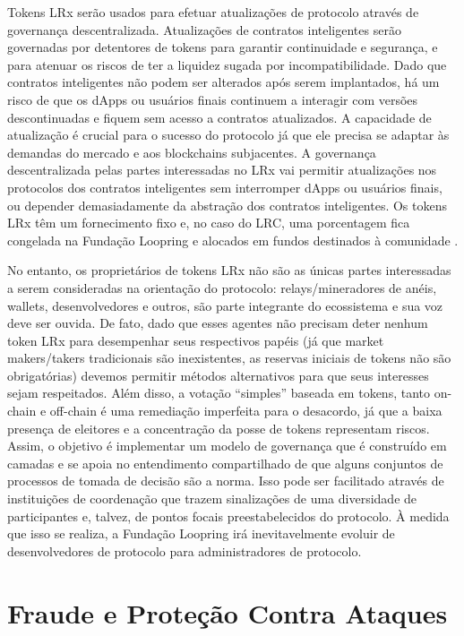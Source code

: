 \documentclass[UTF8,nofonts]{article}
\begin{document}
\begin{multicols}{2}
Tokens LRx serão usados para efetuar atualizações de protocolo através de governança descentralizada. Atualizações de contratos inteligentes serão governadas por detentores de tokens para garantir continuidade e segurança, e para atenuar os riscos de ter a liquidez sugada por incompatibilidade. Dado que contratos inteligentes não podem ser alterados após serem implantados, há um risco de que os dApps ou usuários finais continuem a interagir com versões descontinuadas e fiquem sem acesso a contratos atualizados. A capacidade de atualização é crucial para o sucesso do protocolo já que ele precisa se adaptar às demandas do mercado e aos blockchains subjacentes. A governança descentralizada pelas partes interessadas no LRx vai permitir atualizações nos protocolos dos contratos inteligentes sem interromper dApps ou usuários finais, ou depender demasiadamente da abstração dos contratos inteligentes. Os tokens LRx têm um fornecimento fixo e, no caso do LRC, uma porcentagem fica congelada na Fundação Loopring e alocados em fundos destinados à comunidade \cite{LRCtokendoc}.

No entanto, os proprietários de tokens LRx não são as únicas partes interessadas a serem consideradas na orientação do protocolo: relays/mineradores de anéis, wallets, desenvolvedores e outros, são parte integrante do ecossistema e sua voz deve ser ouvida. De fato, dado que esses agentes não precisam deter nenhum token LRx para desempenhar seus respectivos papéis (já que market makers/takers tradicionais são inexistentes, as reservas iniciais de tokens não são obrigatórias) devemos permitir métodos alternativos para que seus interesses sejam respeitados. Além disso, a votação \enquote{simples} baseada em tokens, tanto on-chain e off-chain é uma remediação imperfeita para o desacordo, já que a baixa presença de eleitores e a concentração da posse de tokens representam riscos. Assim, o objetivo é implementar um modelo de governança que é construído em camadas e se apoia no entendimento compartilhado de que alguns conjuntos de processos de tomada de decisão são a norma. Isso pode ser facilitado através de instituições de coordenação que trazem sinalizações de uma diversidade de participantes e, talvez, de pontos focais preestabelecidos do protocolo. À medida que isso se realiza, a Fundação Loopring irá inevitavelmente evoluir de desenvolvedores de protocolo para administradores de protocolo.

\section{Fraude e Proteção Contra Ataques}


\end{multicols}
\end{document}
